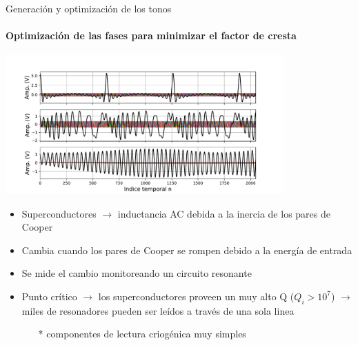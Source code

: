 \documentclass[ignorenonframetext,12pt]{beamer}
\begin{document}
\begin{frame}{Generación y optimización de los tonos}
	\framesubtitle{Optimización de las fases para minimizar el factor de cresta}
	\centering
	\qquad \includegraphics[width=0.8\textwidth]{c3_fases_tres_valores_N}
	\begin{itemize}
		\item \footnotesize{Superconductores $\to$ inductancia AC debida a la
			inercia de los pares de Cooper}
		\item Cambia cuando los pares de Cooper se rompen debido a la
			energía de entrada
		\item Se mide el cambio monitoreando un circuito resonante
		\item Punto crítico $\to$ los \alert{superconductores proveen un muy
			alto Q} ($Q_i > 10^7$) $\to$ miles de resonadores
			pueden ser leídos a través de una sola linea 
			\begin{itemize}
				\item[*] \scriptsize{{\color{blue}componentes de lectura criogénica muy
					simples}}
			\end{itemize}
	\end{itemize}
\end{frame}
\end{document}
